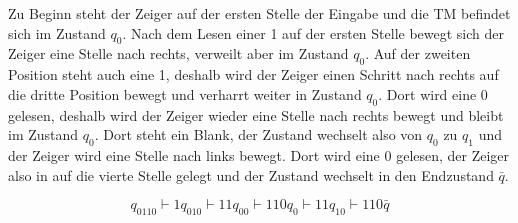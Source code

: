 \begin{exercise}{5}
Zu Beginn steht der Zeiger auf der ersten Stelle der Eingabe und die TM befindet sich im Zustand $q_0$. Nach dem Lesen einer 1 auf der ersten Stelle
bewegt sich der Zeiger eine Stelle nach rechts, verweilt aber im Zustand $q_0$. Auf der zweiten Position steht auch eine 1, deshalb wird der Zeiger 
einen Schritt nach rechts auf die dritte Position bewegt und verharrt weiter in Zustand $q_0$. Dort wird eine 0 gelesen, deshalb wird der Zeiger wieder
eine Stelle nach rechts bewegt und bleibt im Zustand $q_0$. Dort steht ein Blank, der Zustand wechselt also von $q_0$ zu $q_1$ und der Zeiger wird
eine Stelle nach links bewegt. Dort wird eine 0 gelesen, der Zeiger also in auf die vierte Stelle gelegt und der Zustand wechselt in den Endzustand $\bar{q}$.

\[q_0110\vdash 1q_010 \vdash 11q_00\vdash 110q_0\vdash 11q_10\vdash 110\bar{q}\]
\end{exercise}
